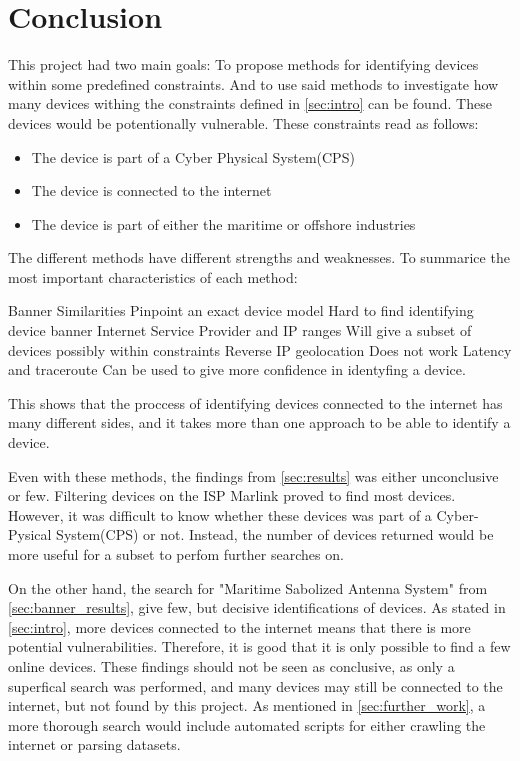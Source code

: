 \section{Conclusion} \label{sec:conclusion}
This project had two main goals: To propose methods for identifying devices within some predefined constraints. And to use said methods to investigate how many devices withing the constraints defined in \cref{sec:intro} can be found. These devices would be potentionally vulnerable. 
These constraints read as follows:
\begin{itemize}
    \item The device is part of a Cyber Physical System(CPS)
    \item The device is connected to the internet
    \item The device is part of either the maritime or offshore industries
\end{itemize}

The different methods have different strengths and weaknesses. To summarice the most important characteristics of each method:

\begin{outline}[itemize]
    \setlength\itemsep{10em}
        \1 Banner Similarities
        \2 Pinpoint an exact device model
        \2 Hard to find identifying device banner
        \1 Internet Service Provider and IP ranges
        \2 Will give a subset of devices possibly within constraints
        \1 Reverse IP geolocation
        \2 Does not work
        \1 Latency and traceroute
        \2 Can be used to give more confidence in identyfing a device.
\end{outline}

This shows that the proccess of identifying devices connected to the internet has many different sides, and it takes more than one approach to be able to identify a device.

Even with these methods, the findings from \cref{sec:results} was either unconclusive or few. Filtering devices on the ISP Marlink proved to find most devices. However, it was difficult to know whether these devices was part of a Cyber-Pysical System(CPS) or not. Instead, the number of devices returned would be more useful for a subset to perfom further searches on. 

On the other hand, the search for "Maritime Sabolized Antenna System" from \cref{sec:banner_results}, give few, but decisive identifications of devices. As stated in \cref{sec:intro}, more devices connected to the internet means that there is more potential vulnerabilities. Therefore, it is good that it is only possible to find a few online devices. These findings should not be seen as conclusive, as only a superfical search was performed, and many devices may still be connected to the internet, but not found by this project. As mentioned in \cref{sec:further_work}, a more thorough search would include automated scripts for either crawling the internet or parsing datasets. 


